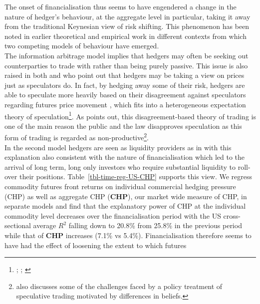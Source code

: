 \documentclass[
  authoryear,
  preprint,
  3p]{elsarticle}
\begin{document}
\medskip

The onset of financialisation thus seems to have engendered a change in
the nature of hedger's behaviour, at the aggregate level in particular,
taking it away from the traditional Keynesian view of risk shifting.
This phenomenon has been noted in earlier theoretical and empirical work
\citep{danthine_information_1978, stout_why_1998} in different contexts
from which two competing models of behaviour have emerged.\\
The information arbitrage model
\citep{grossman_impossibility_1980, danthine_information_1978, kyle_informed_1989}
implies that hedgers may often be seeking out counterparties to trade
with rather than being purely passive. This issue is also raised in both
\citet{cheng_financialisation_2014} and \citet{stulz_rethink_1996} who
point out that hedgers may be taking a view on prices just as
speculators do. In fact, by hedging away some of their risk, hedgers are
able to speculate more heavily based on their disagreement against
speculators regarding futures price movement
\citep{simsek_speculation_2013}, which fits into a heterogeneous
expectation theory of speculation\footnote{\citet{hirshleifer_speculation_1975};
  \citet{hirshleifer_reply_1976}; \citet{hirshleifer_theory_1977}}. As
\citet{stout_why_1998} points out, this disagreement-based theory of
trading is one of the main reason the public and the law disapproves
speculation as this form of trading is regarded as
non-productive\footnote{\citet{duffie_challenges_2014} also discusses
  some of the challenges faced by a policy treatment of speculative
  trading motivated by differences in beliefs.}.\\
In the second model hedgers are seen as liquidity providers as in
\citet{kang_tale_2020} with this explanation also consistent with the
nature of financialisation which led to the arrival of long term, long
only investors who require substantial liquidity to roll-over their
positions. Table~\ref{tbl-time-reg-US-CHP} supports this view. We
regress commodity futures front returns on individual commercial hedging
pressure (CHP) as well as aggregate CHP (\textbf{CHP}), our market wide
measure of CHP, in separate models and find that the explanatory power
of CHP at the individual commodity level decreases over the
financialisation period with the US cross-sectional average \(R^{2}\)
falling down to 20.8\% from 25.8\% in the previous period while that of
\textbf{CHP} increases (7.1\% vs 5.4\%). Financialisation therefore
seems to have had the effect of loosening the extent to which futures
\end{document}
